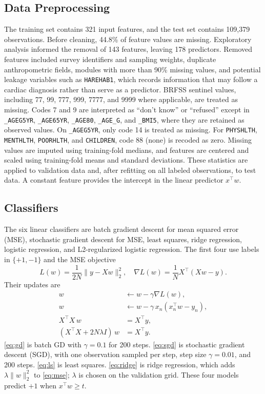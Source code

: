 \documentclass[10pt,conference,compsocconf]{IEEEtran}
\begin{document}
\subsection{Data Preprocessing}
The training set contains 321 input features, and the test set contains 109{,}379 observations. Before cleaning, 44.8\% of feature values are missing. Exploratory analysis informed the removal of 143 features, leaving 178 predictors. Removed features included survey identifiers and sampling weights, duplicate anthropometric fields, modules with more than 90\% missing values, and potential leakage variables such as \texttt{HAREHAB1}, which records information that may follow a cardiac diagnosis rather than serve as a predictor.
BRFSS sentinel values, including 77, 99, 777, 999, 7777, and 9999 where applicable, are treated as missing. Codes 7 and 9 are interpreted as ``don't know'' or ``refused'' except in \texttt{\_AGEG5YR}, \texttt{\_AGE65YR}, \texttt{\_AGE80}, \texttt{\_AGE\_G}, and \texttt{\_BMI5}, where they are retained as observed values. On \texttt{\_AGEG5YR}, only code 14 is treated as missing. For \texttt{PHYSHLTH}, \texttt{MENTHLTH}, \texttt{POORHLTH}, and \texttt{CHILDREN}, code 88 (none) is recoded as zero.
Missing values are imputed using training-fold medians, and features are centered and scaled using training-fold means and standard deviations. These statistics are applied to validation data and, after refitting on all labeled observations, to test data. A constant feature provides the intercept in the linear predictor $x^\top w$.

\subsection{Classifiers}
The six linear classifiers are batch gradient descent for mean squared error (MSE), stochastic gradient descent for MSE, least squares, ridge regression, logistic regression, and L2-regularized logistic regression. The first four use labels in $\{+1,-1\}$ and the MSE objective
\begin{equation}
L(w)=\frac{1}{2N}\|y-Xw\|_2^2,
\quad
\nabla L(w)=\frac{1}{N}X^\top(Xw-y).
\label{eq:mse}
\end{equation}
Their updates are
\begin{align}
w &\leftarrow w-\gamma\nabla L(w),
\label{eq:gd}\\
w &\leftarrow w-\gamma\, x_n(x_n^\top w-y_n),
\label{eq:sgd}\\
X^\top X\, w &= X^\top y,
\label{eq:ls}\\
(X^\top X+2N\lambda I)\,w &= X^\top y.
\label{eq:ridge}
\end{align}
\eqref{eq:gd} is batch GD with $\gamma=0.1$ for 200 steps.
\eqref{eq:sgd} is stochastic gradient descent (SGD), with one observation sampled per step, step size $\gamma=0.01$, and 200 steps.
\eqref{eq:ls} is least squares.
\eqref{eq:ridge} is ridge regression, which adds $\lambda\|w\|_2^2$ to \eqref{eq:mse}; $\lambda$ is chosen on the validation grid.
These four models predict $+1$ when $x^\top w\ge t$.
\end{document}
